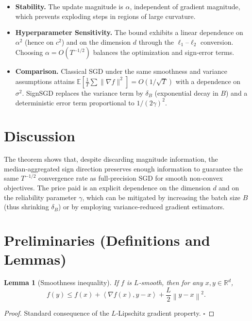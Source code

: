 \documentclass{article}
\newtheorem{lemma}{Lemma}
\newcommand{\EE}{\mathbb{E}}
\newcommand{\RR}{\mathbb{R}}
\newcommand{\norm}[1]{\left\|#1\right\|}
\newcommand{\inner}[2]{\left\langle #1,#2\right\rangle}
\newcommand{\grad}{\nabla}
\begin{document}
\begin{itemize}
\item \textbf{Stability.} The update magnitude is $\alpha$, independent of gradient magnitude, which prevents exploding steps in regions of large curvature.
\item \textbf{Hyperparameter Sensitivity.} The bound exhibits a linear dependence on $\alpha^{2}$ (hence on $c^{2}$) and on the dimension $d$ through the $\ell_{1}$–$\ell_{2}$ conversion. Choosing $\alpha=O(T^{-1/2})$ balances the optimization and sign‑error terms.
\item \textbf{Comparison.} Classical SGD under the same smoothness and variance assumptions attains $\EE[\frac{1}{T}\sum\|\grad f\|^{2}]=O(1/\sqrt{T})$ with a dependence on $\sigma^{2}$. SignSGD replaces the variance term by $\delta_{B}$ (exponential decay in $B$) and a deterministic error term proportional to $1/(2\gamma)^{2}$.
\end{itemize}

\section*{Discussion}

The theorem shows that, despite discarding magnitude information, the median‑aggregated sign direction preserves enough information to guarantee the same $T^{-1/2}$ convergence rate as full‑precision SGD for smooth non‑convex objectives.  The price paid is an explicit dependence on the dimension $d$ and on the reliability parameter $\gamma$, which can be mitigated by increasing the batch size $B$ (thus shrinking $\delta_{B}$) or by employing variance‑reduced gradient estimators.

\section*{Preliminaries (Definitions and Lemmas)}

\begin{lemma}[Smoothness inequality]\label{lem:smooth}
If $f$ is $L$‑smooth, then for any $x,y\in\RR^{d}$,
\[
f(y)\le f(x)+\inner{\grad f(x)}{y-x}+\frac{L}{2}\norm{y-x}^{2}.
\]
\end{lemma}
\begin{proof}
Standard consequence of the $L$‑Lipschitz gradient property. \hfill $\square$
\end{proof}
\end{document}
